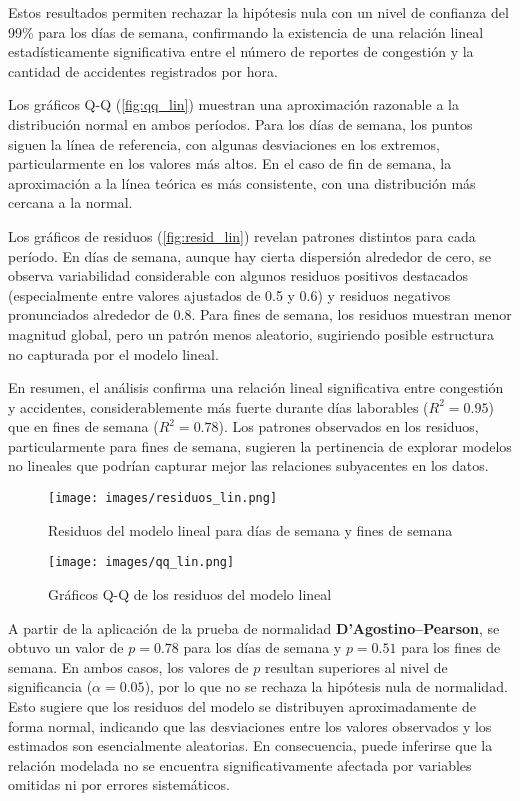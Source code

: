 \documentclass[12pt]{article}
\begin{document}
Estos resultados permiten rechazar la hipótesis nula con un nivel de confianza del 99\% para los días de semana, confirmando la existencia de una relación lineal estadísticamente significativa entre el número de reportes de congestión y la cantidad de accidentes registrados por hora.

Los gráficos Q-Q (\autoref{fig:qq_lin}) muestran una aproximación razonable a la distribución normal en ambos períodos. Para los días de semana, los puntos siguen la línea de referencia, con algunas desviaciones en los extremos, particularmente en los valores más altos. En el caso de fin de semana, la aproximación a la línea teórica es más consistente, con una distribución más cercana a la normal.

Los gráficos de residuos (\autoref{fig:resid_lin}) revelan patrones distintos para cada período. En días de semana, aunque hay cierta dispersión alrededor de cero, se observa variabilidad considerable con algunos residuos positivos destacados (especialmente entre valores ajustados de 0.5 y 0.6) y residuos negativos pronunciados alrededor de 0.8. Para fines de semana, los residuos muestran menor magnitud global, pero un patrón menos aleatorio, sugiriendo posible estructura no capturada por el modelo lineal.

En resumen, el análisis confirma una relación lineal significativa entre congestión y accidentes, considerablemente más fuerte durante días laborables ($R^2 = 0.95$) que en fines de semana ($R^2 = 0.78$). Los patrones observados en los residuos, particularmente para fines de semana, sugieren la pertinencia de explorar modelos no lineales que podrían capturar mejor las relaciones subyacentes en los datos.


\begin{figure}[H]
\centering
\texttt{[image: images/residuos\_lin.png]}
\caption{Residuos del modelo lineal para días de semana y fines de semana}
\label{fig:resid_lin}
\end{figure}

\begin{figure}[H]
\centering
\texttt{[image: images/qq\_lin.png]}
\caption{Gráficos Q-Q de los residuos del modelo lineal}
\label{fig:qq_lin}
\end{figure}


A partir de la aplicación de la prueba de normalidad \textbf{D'Agostino–Pearson}, se obtuvo un valor de $p = 0.78$ para los días de semana y $p = 0.51$ para los fines de semana. En ambos casos, los valores de $p$ resultan superiores al nivel de significancia ($\alpha = 0.05$), por lo que no se rechaza la hipótesis nula de normalidad. Esto sugiere que los residuos del modelo se distribuyen aproximadamente de forma normal, indicando que las desviaciones entre los valores observados y los estimados son esencialmente aleatorias. En consecuencia, puede inferirse que la relación modelada no se encuentra significativamente afectada por variables omitidas ni por errores sistemáticos.
\end{document}
